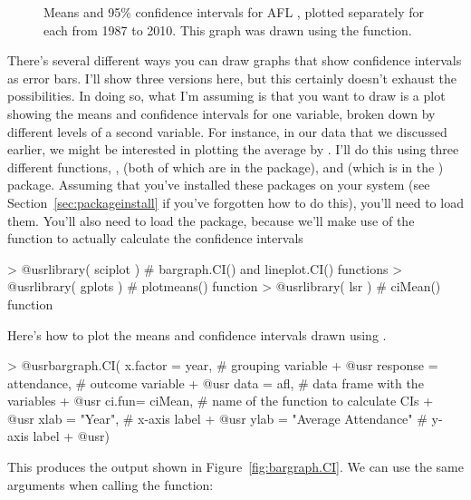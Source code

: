 \begin{figure}
\begin{center}
\caption{Means and 95\% confidence intervals for AFL , plotted separately for each  from 1987 to 2010. This graph was drawn using the  function.}
\label{fig:plotmeans}
\HR
\end{center}
\end{figure}


There's several different ways you can draw graphs that show confidence intervals as error bars. I'll show three versions here, but this certainly doesn't exhaust the possibilities. In doing so, what I'm assuming is that you want to draw is a plot showing the means and confidence intervals for one variable, broken down by different levels of a second variable. For instance, in our  data that we discussed earlier, we might be interested in plotting the average  by . I'll do this using three different functions, ,  (both of which are in the  package), and  (which is in the ) package. Assuming that you've installed these packages on your system (see Section~\ref{sec:packageinstall} if you've forgotten how to do this), you'll need to load them. You'll also need to load the  package, because we'll make use of the  function to actually calculate the confidence intervals
\begin{rblock1}
> @usr{library( sciplot )}     # bargraph.CI() and lineplot.CI() functions
> @usr{library( gplots )}      # plotmeans() function
> @usr{library( lsr )}         # ciMean() function
\end{rblock1}
Here's how to plot the means and confidence intervals drawn using .
\begin{rblock1}
> @usr{bargraph.CI( x.factor = year,}            # grouping variable 
+ @usr{             response = attendance, }     # outcome variable
+ @usr{             data = afl, }                # data frame with the variables
+ @usr{             ci.fun= ciMean,}             # name of the function to calculate CIs
+ @usr{             xlab = "Year", }             # x-axis label
+ @usr{             ylab = "Average Attendance"} # y-axis label
+ @usr{)}
\end{rblock1}
This produces the output shown in Figure~\ref{fig:bargraph.CI}. We can use the same arguments when calling the  function:
